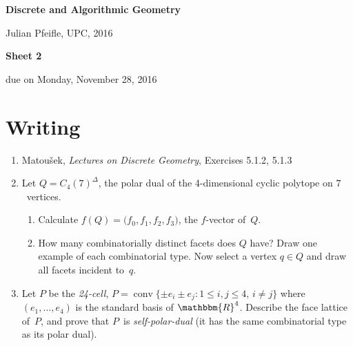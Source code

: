 \documentclass[11pt]{amsart}
\DeclareMathOperator{\conv}{conv}
\newcommand{\RR}{\mathbbm{R}}
\begin{document}
\begin{center}
\textbf{\sffamily
   Discrete and Algorithmic Geometry }

\medskip
   Julian Pfeifle,
   UPC, 2016
\end{center}

\bigskip

\begin{center}
  \textbf{\sffamily Sheet 2}

\bigskip
 due on Monday, November 28, 2016

\end{center}

\bigskip
\bigskip
\bigskip

\section*{Writing}

\begin{enumerate}
\item Matou\v sek, \emph{Lectures on Discrete Geometry}, Exercises 5.1.2, 5.1.3

\item Let $Q=C_4(7)^\Delta$, the polar dual of the 4-dimensional cyclic polytope on $7$~vertices.
  \begin{enumerate}
  \item Calculate $f(Q)=\big(f_0,f_1,f_2,f_3)$, the $f$-vector of~$Q$.
  \item How many combinatorially distinct facets does $Q$ have? Draw one example of each combinatorial type. Now select a vertex $q\in Q$ and draw all facets incident to~$q$.
  \end{enumerate}
\item Let $P$ be the \emph{24-cell}, $P=\conv\{ \pm e_i \pm e_j : 1\le i,j\le 4,\, i\ne j\}$ where $(e_1,\dots,e_4)$ is the standard basis of $\RR^4$. Describe the face lattice of~$P$, and prove that $P$~is \emph{self-polar-dual} (it has the same combinatorial type as its polar dual).
\end{enumerate}
\end{document}
